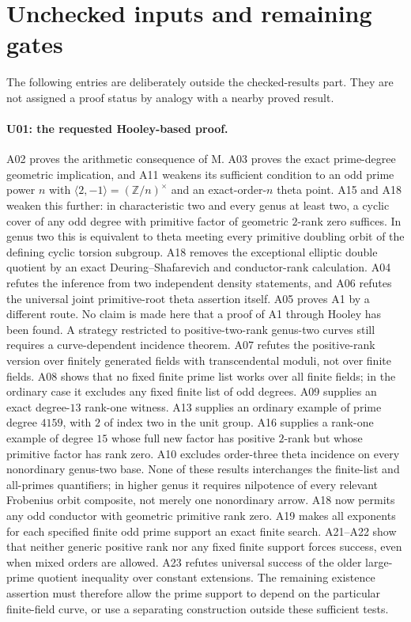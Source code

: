 \documentclass[11pt,a4paper]{article}
\begin{document}
\section{Unchecked inputs and remaining gates}
\label{sec:remaining}

The following entries are deliberately outside the checked-results
part. They are not assigned a proof status by analogy with a nearby
proved result.

\paragraph{U01: the requested Hooley-based proof.}
A02 proves the arithmetic consequence of M. A03 proves the exact
prime-degree geometric implication, and A11 weakens its sufficient
condition to an odd prime power $n$ with
$\langle2,-1\rangle=(\mathbb Z/n)^\times$ and an exact-order-$n$
theta point. A15 and A18 weaken this further: in characteristic two and every
genus at least two, a cyclic cover of any odd degree with primitive
factor of geometric $2$-rank zero suffices. In genus two this is
equivalent to theta meeting every primitive doubling orbit of the
defining cyclic torsion subgroup. A18 removes the exceptional
elliptic double quotient by an exact Deuring--Shafarevich and
conductor-rank calculation.
A04 refutes the inference from
two independent density statements, and A06 refutes the universal
joint primitive-root theta assertion itself. A05 proves A1 by a
different route. No claim is made here that a proof of A1 through
Hooley has been found. A strategy restricted to positive-two-rank
genus-two curves still requires a curve-dependent incidence theorem.
A07 refutes the positive-rank version over finitely generated fields
with transcendental moduli, not over finite fields. A08 shows that
no fixed finite prime list works over all finite fields; in the
ordinary case it excludes any fixed finite list of odd degrees.
A09 supplies an exact degree-$13$ rank-one witness. A13 supplies an
ordinary example of prime degree $4159$, with $2$ of index two in
the unit group. A16 supplies a rank-one example of degree $15$
whose full new factor has positive $2$-rank but whose primitive
factor has rank zero. A10 excludes order-three theta incidence on every nonordinary
genus-two base. None of
these results interchanges the finite-list and all-primes quantifiers;
in higher genus it requires nilpotence of every relevant Frobenius
orbit composite, not merely one nonordinary arrow.
A18 now permits any odd conductor with geometric primitive rank zero.
A19 makes all exponents for each specified finite odd prime support
an exact finite search. A21--A22 show that neither generic
positive rank nor any fixed finite support forces success, even
when mixed orders are allowed. A23 refutes universal success of
the older large-prime quotient inequality over constant extensions.
The remaining existence assertion must therefore allow the prime
support to depend on the particular finite-field curve, or use a
separating construction outside these sufficient tests.
\end{document}
